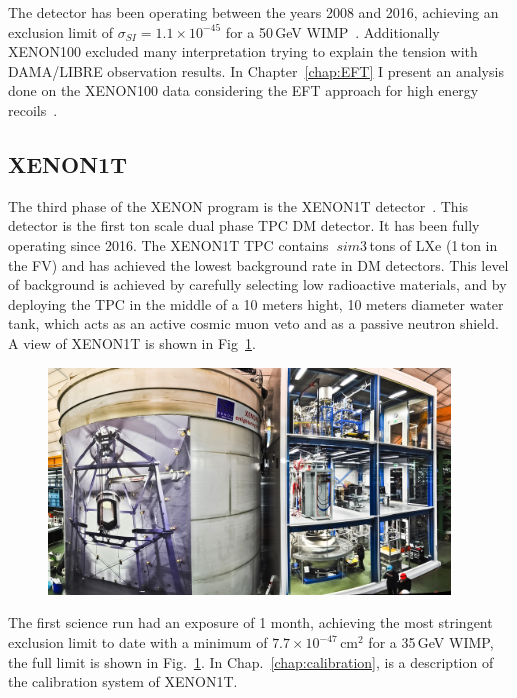 The detector has been operating between the years 2008 and 2016, achieving an exclusion limit of $\sigma_{SI} = 1.1 \times 10^{-45}$ for a 50\,GeV WIMP~\cite{xe100_run_combination}. Additionally XENON100 excluded many interpretation trying to explain the tension with DAMA/LIBRE observation results. In Chapter~\ref{chap:EFT} I present an analysis done on the XENON100 data considering the EFT approach for high energy recoils~\cite{Aprile:2017aas}.  

\subsection{XENON1T}
\label{sec:xe1T}

The third phase of the XENON program is the XENON1T detector~\cite{Aprile:2017aty}. This detector is the first ton scale dual phase TPC  DM detector. It has been fully operating since 2016. The XENON1T TPC contains $~sim 3$\,tons of LXe (1\,ton in the FV) and has achieved the lowest background rate in DM detectors. This level of background is achieved by carefully selecting low radioactive materials, and by deploying the TPC in the middle of a 10 meters hight, 10 meters diameter water tank, which acts as an active cosmic muon veto and as a passive neutron shield. A view of XENON1T is shown in Fig~\ref{fig:xe1tLim}.

\begin{figure}[]
	\centering
	\includegraphics[width=0.95\textwidth]{figs/xe1tImg.png}
	\label{fig:xe1tLim}
\end{figure}

The first science run had an exposure of 1 month, achieving the most stringent  exclusion limit to date with a minimum of $7.7\times10^{-47}$\,cm$^2$ for a 35\,GeV WIMP, the full limit is shown in Fig.~\ref{fig:xe1tLim}. In Chap.~\ref{chap:calibration}, is a description of the calibration system of XENON1T.
 
